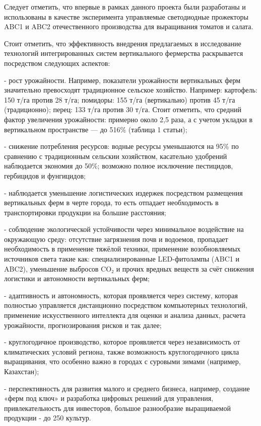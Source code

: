 \begin{multicols}{2}
Следует отметить, что впервые в рамках данного проекта были разработаны
и использованы в качестве эксперимента управляемые светодиодные
прожекторы ABC1 и ABC2 отечественного производства для выращивания
томатов и салата.

Стоит отметить, что эффективность внедрения предлагаемых в исследование
технологий интегрированных систем вертикального фермерства раскрывается
посредством следующих аспектов:

- рост урожайности. Например, показатели урожайности вертикальных ферм
значительно превосходят традиционное сельское хозяйство. Например:
картофель: 150 т/га против 28 т/га; помидоры: 155 т/га (вертикально)
против 45 т/га (традиционно); перец: 133 т/га против 30 т/га. Стоит
отметить, что средний фактор увеличения урожайности: примерно около 2,5
раза, а с учетом укладки в вертикальном пространстве --- до 516\%
(таблица 1 статьи);

- снижение потребления ресурсов: водные ресурсы уменьшаются на 95\% по
сравнению с традиционным сельскии хозяйством, касательно удобрений
наблюдается экономия до 50\%; возможно полное исключение пестицидов,
гербицидов и фунгицидов;

- наблюдается уменьшение логистических издержек посредством размещения
вертикальных ферм в черте города, то есть отпадает необходимость в
транспортировки продукции на большие расстояния;

- соблюдение экологической устойчивости через минимальное воздействие на
окружающую среду: отсутствие загрязнения почв и водоемов, пропадает
необходимость в применение тяжёлой техники, применение возобновляемых
источников света такие как: специализированные LED-фитолампы (ABC1 и
ABC2), уменьшение выбросов CO₂ и прочих вредных веществ за счёт снижения
логистики и автономности вертикальных ферм;

- адаптивность и автономность, которая проявляется через систему,
которая полностью управляется дистанционно посредством компьютерных
технологий, применение искусственного интеллекта для оценки и анализа
данных, расчета урожайности, прогнозирования рисков и так далее;

- круглогодичное производство, которое проявляется через независимость
от климатических условий региона, также возможность круглогодичного
цикла выращивания, что особенно важно в городах с суровыми зимами
(например, Казахстан);

- перспективность для развития малого и среднего бизнеса, например,
создание «ферм под ключ» и разработка цифровых решений для управления,
привлекательность для инвесторов, большое разнообразие выращиваемой
продукции - до 250 культур.


\end{multicols}
